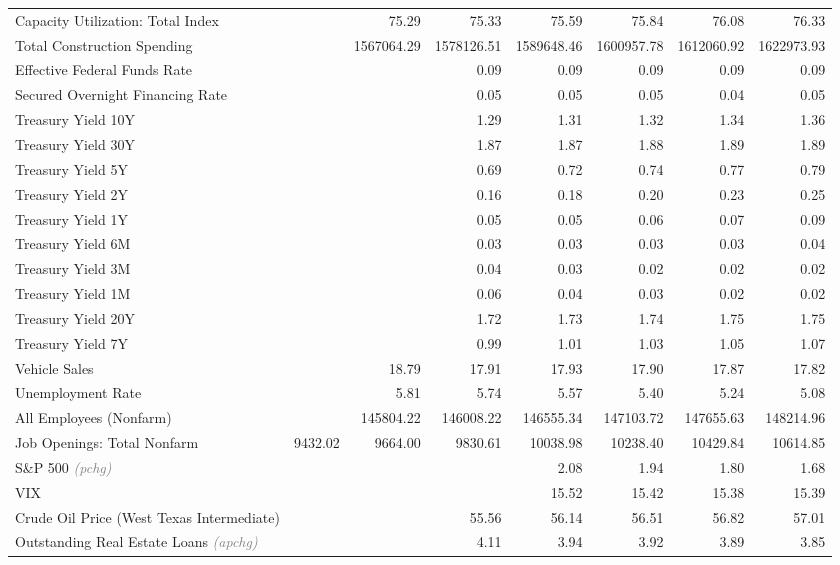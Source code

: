 \documentclass[11pt, letterpaper]{article}\usepackage[]{graphicx}\usepackage[]{color}
\begin{document}
\begin{table}[H]
\begin{tabular}{lrrrrrrr}
  Capacity Utilization: Total Index &  & 75.29 & 75.33 & 75.59 & 75.84 & 76.08 & 76.33 \\ 
  Total Construction Spending &  & 1567064.29 & 1578126.51 & 1589648.46 & 1600957.78 & 1612060.92 & 1622973.93 \\ 
  Effective Federal Funds Rate &  &  & 0.09 & 0.09 & 0.09 & 0.09 & 0.09 \\ 
  Secured Overnight Financing Rate &  &  & 0.05 & 0.05 & 0.05 & 0.04 & 0.05 \\ 
  Treasury Yield 10Y &  &  & 1.29 & 1.31 & 1.32 & 1.34 & 1.36 \\ 
  Treasury Yield 30Y &  &  & 1.87 & 1.87 & 1.88 & 1.89 & 1.89 \\ 
  Treasury Yield 5Y &  &  & 0.69 & 0.72 & 0.74 & 0.77 & 0.79 \\ 
  Treasury Yield 2Y &  &  & 0.16 & 0.18 & 0.20 & 0.23 & 0.25 \\ 
  Treasury Yield 1Y &  &  & 0.05 & 0.05 & 0.06 & 0.07 & 0.09 \\ 
  Treasury Yield 6M &  &  & 0.03 & 0.03 & 0.03 & 0.03 & 0.04 \\ 
  Treasury Yield 3M &  &  & 0.04 & 0.03 & 0.02 & 0.02 & 0.02 \\ 
  Treasury Yield 1M &  &  & 0.06 & 0.04 & 0.03 & 0.02 & 0.02 \\ 
  Treasury Yield 20Y &  &  & 1.72 & 1.73 & 1.74 & 1.75 & 1.75 \\ 
  Treasury Yield 7Y &  &  & 0.99 & 1.01 & 1.03 & 1.05 & 1.07 \\ 
  Vehicle Sales &  & 18.79 & 17.91 & 17.93 & 17.90 & 17.87 & 17.82 \\ 
  Unemployment Rate &  & 5.81 & 5.74 & 5.57 & 5.40 & 5.24 & 5.08 \\ 
  All Employees (Nonfarm) &  & 145804.22 & 146008.22 & 146555.34 & 147103.72 & 147655.63 & 148214.96 \\ 
  Job Openings: Total Nonfarm & 9432.02 & 9664.00 & 9830.61 & 10038.98 & 10238.40 & 10429.84 & 10614.85 \\ 
  S\&P 500 \textit{\footnotesize\textcolor{gray}{(pchg)}} &  &  &  & 2.08 & 1.94 & 1.80 & 1.68 \\ 
  VIX &  &  &  & 15.52 & 15.42 & 15.38 & 15.39 \\ 
  Crude Oil Price (West Texas Intermediate) &  &  & 55.56 & 56.14 & 56.51 & 56.82 & 57.01 \\ 
  Outstanding Real Estate Loans \textit{\footnotesize\textcolor{gray}{(apchg)}} &  &  & 4.11 & 3.94 & 3.92 & 3.89 & 3.85 \\ 

\end{tabular}
\end{table}
\end{document}
